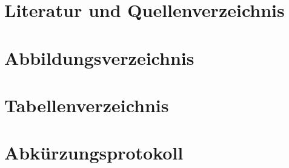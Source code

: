 \documentclass[12pt]{scrartcl}
\begin{document}
\section{Literatur und Quellenverzeichnis}
\label{sec:literatur-quellenverzeichnis}

\section{Abbildungsverzeichnis}
\label{sec:abbildungsverzeichnis}

\section{Tabellenverzeichnis}
\label{sec:tabellenverzeichnis}

\section{Abkürzungsprotokoll}
\label{sec:abkuerzungsprotokoll}
\end{document}
